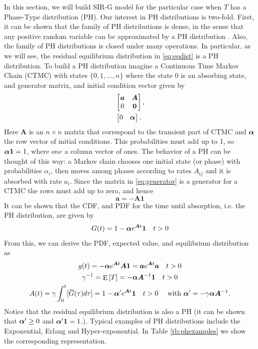 \documentclass[twoside,USenglish,10pt]{article}
\newcommand{\ie}{i.e.\xspace}
\newcommand{\Gb}{\overline{G}\xspace}
\newcommand{\bA}{\ensuremath{\bm A}\xspace}
\newcommand{\bal}{\ensuremath\bm{\alpha}\xspace}
\newcommand{\ba}{\ensuremath{\bm a}\xspace}
\newcommand{\one}{\ensuremath{\bm 1}\xspace}
\DeclareMathOperator{\Exp}{E}       %
\newcommand{\E}[1]{\Exp\left[{#1}\right]}       %
\begin{document}
In this section, we will build SIR-G model for the particular case when $T$ has a Phase-Type distribution (PH)\cite{neut81,lato.rama99}. Our interest in PH distributions is two-fold. First, it can be shown that the family of PH distributions is dense, in the sense that any positive random variable can be approximated by a PH distribution \cite{neut81}.
Also, the family of PH distributions is closed under many operations. In particular, as we will see, the residual equilibrium distribution in \eqref{eq:eqdist} is a PH distribution. To build a PH distribution imagine a Continuous Time Markov Chain (CTMC) with states $\{0,1,\ldots,n\}$ where the state $0$ is an absorbing state, and generator matrix, and initial condition vector given by
\begin{align}
	&\begin{bmatrix}
		\ba  & \bA \\
		0    & {\bm{0}}
	\end{bmatrix}, 	\label{eq:generator}\\ 
	&\begin{bmatrix}
		 0 & \bal
	\end{bmatrix}.
\end{align}
Here $\bA$ is an $n\times n$ matrix that correspond to the transient part of CTMC and $\bal$ the row vector of initial conditions. This probabilities must add up to 1, so $\bal\one=1$, where $one$ a column vector of ones. The behavior of a PH can be thought of this way: a Markov chain chooses one initial state (or phase) with probabilities $\alpha_i$,  then moves among phases according to rates $A_{ij}$ and it is absorbed with rate $a_i$. Since the matrix in \eqref{eq:generator} is a generator for a CTMC the rows must add up to zero, and hence 
\[ \ba = -\bA\one\]
It can be shown that the CDF, and PDF for the time until absorption, \ie the PH distribution, are given by
\begin{equation}
G(t) = 1 - \bal e^{\bA t} \one \quad t>0 
\end{equation}
From this, we can derive the PDF, expected value, and equilibrium distribution as 
\begin{gather}
g(t) =  -\bal e^{\bA t} \bA\one=\ba e^{\bA t} \ba \quad t>0 \\
\gamma^{-1} = \E{T} = - \bal \bA^{-1} \one \quad t>0 \\
A(t) =\gamma \int_0^t[\Gb(\tau)d\tau] = 1 - \bal'e^{\bA t} \one  \quad t>0 
      \quad  \text{ with }  \bal'=-\gamma\bal \bA^{-1}.
\end{gather}
Notice that the residual equilibrium distribution is also a PH (it can be shown that $\bal'\geq 0$ and $\bal'\one=1$.). Typical examples of PH distributions include the Exponential, Erlang and Hyper-exponential. In Table \ref{tb:phexamples} we show the corresponding representation.
\end{document}
